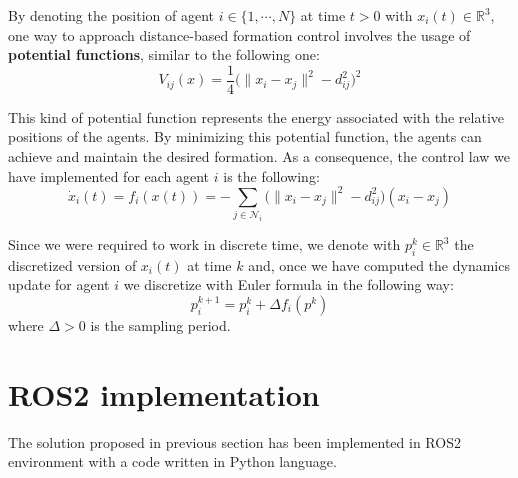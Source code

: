 \documentclass[a4paper,11pt,oneside]{book}
\begin{document}
By denoting the position of agent $i \in \{1, \cdots, N\}$ at time $t>0$ with $x_i(t) \in \mathbb{R}^3$, one way to approach distance-based formation control involves the usage of \textbf{potential functions}, similar to the following one:
\begin{equation}
V_{ij}(x)  = \frac{1}{4} \bigg( \lVert x_i - x_j \rVert^2 - d_{ij}^2 \bigg)^2
\label{Formation_potential}
\end{equation}

This kind of potential function represents the energy associated with the relative positions of the agents. By minimizing this potential function, the agents can achieve and maintain the desired formation.
As a consequence, the control law we have implemented for each agent $i$ is the following:
\begin{equation}
\dot{x}_i(t) = f_i(x(t)) = - \sum_{j \in \mathcal{N}_i} \bigg( \lVert x_i - x_j \rVert^2 - d_{ij}^2 \bigg) (x_i - x_j )
\end{equation}

Since we were required to work in discrete time, we denote with $p_i^k \in \mathbb{R}^3$ the discretized version of $x_i(t)$ at time $k$ and, once we have computed the dynamics update for agent $i$ we discretize with Euler formula in the following way:
\begin{equation}
p_i^{k+1} = p_i^{k} + \Delta f_i(p^k)
\end{equation}
where $\Delta > 0$ is the sampling period.

\section{ROS2 implementation}
The solution proposed in previous section has been implemented in ROS2 environment with a code written in Python language.
\end{document}
